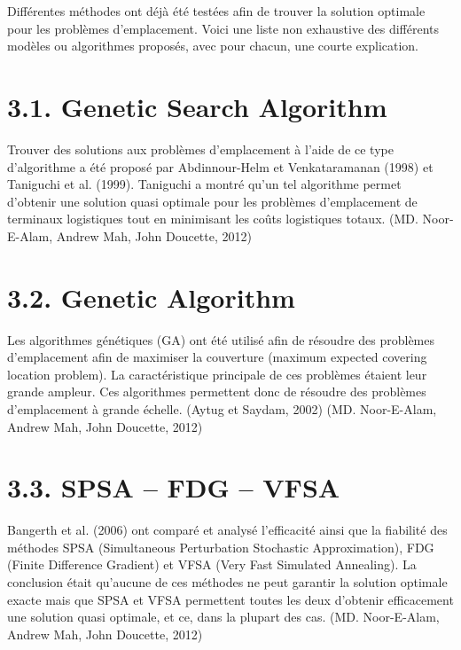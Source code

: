 \bigskip

Différentes méthodes ont déjà été testées afin de trouver la solution optimale pour les problèmes d'emplacement. Voici une liste non exhaustive des différents modèles ou algorithmes proposés, avec pour chacun, une courte explication.

\section*{3.1. Genetic Search Algorithm}

\bigskip

Trouver des solutions aux problèmes d'emplacement à l'aide de ce type d'algorithme a été proposé par Abdinnour-Helm et Venkataramanan (1998) et Taniguchi et al. (1999). Taniguchi a montré qu'un tel algorithme permet d'obtenir une solution quasi optimale pour les problèmes d'emplacement de terminaux logistiques tout en minimisant les coûts logistiques totaux. (MD. Noor-E-Alam, Andrew Mah, John Doucette, 2012)

\section*{3.2. Genetic Algorithm}

\bigskip

Les algorithmes génétiques (GA) ont été utilisé afin de résoudre des problèmes d'emplacement afin de maximiser la couverture (maximum expected covering location problem). La caractéristique principale de ces problèmes étaient leur grande ampleur. Ces algorithmes permettent donc de résoudre des problèmes d'emplacement à grande échelle. (Aytug et Saydam, 2002) (MD. Noor-E-Alam, Andrew Mah, John Doucette, 2012)

\section*{3.3. SPSA – FDG – VFSA}

\bigskip

Bangerth et al. (2006) ont comparé et analysé l'efficacité ainsi que la fiabilité des méthodes SPSA (Simultaneous Perturbation Stochastic Approximation), FDG (Finite Difference Gradient) et VFSA (Very Fast Simulated Annealing). La conclusion était qu'aucune de ces méthodes ne peut garantir la solution optimale exacte mais que SPSA et VFSA permettent toutes les deux d'obtenir efficacement une solution quasi optimale, et ce, dans la plupart des cas. (MD. Noor-E-Alam, Andrew Mah, John Doucette, 2012)

